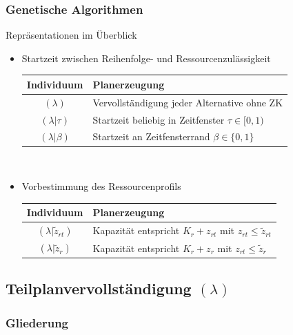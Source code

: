 \begin{frame}
\frametitle{Genetische Algorithmen}
Repräsentationen im Überblick
\begin{itemize}
	\item \small{Startzeit zwischen Reihenfolge- und Ressourcenzulässigkeit}\\[2mm]
	\begin{small}
	\begin{tabular}{cp{7.5cm}}
	\hline
	Individuum & Planerzeugung\\
	\hline
	$(\lambda)$ & Vervollständigung jeder Alternative ohne ZK\\	
	$(\lambda|\tau)$& Startzeit beliebig in Zeitfenster $\tau \in [0,1)$\\
	$(\lambda|\beta)$& Startzeit an Zeitfensterrand $\beta \in \{0,1\}$\\
	\end{tabular}
	\end{small}\\[4mm]
	
	\item \small{Vorbestimmung des Ressourcenprofils}\\[2mm]
	\begin{small}
		\begin{tabular}{cp{7.5cm}}
			\hline
			Individuum & Planerzeugung\\
			\hline
			$(\lambda|\tilde{z}_{rt})$ & Kapazität entspricht $K_r+z_{rt}$ mit $z_{rt} \leq \tilde{z}_{rt}$ \\
			$(\lambda|\tilde{z}_r)$ & Kapazität entspricht $K_r+z_r$ mit $z_{rt} \leq \tilde{z}_{r}$\\
		\end{tabular}
	\end{small}
\end{itemize}
\end{frame}


\subsection{Teilplanvervollständigung $(\lambda)$}
\begin{frame}
	\frametitle{Gliederung}
	\tableofcontents[currentsubsection]
\end{frame}

